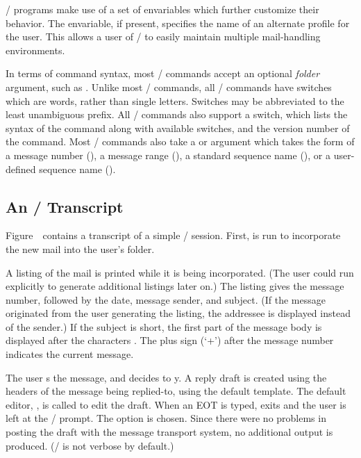 \MH/ programs make use of a set of envariables
which further customize their behavior.
The  envariable, if present,
specifies the name of an alternate profile for the user.
This allows a user of \MH/ to
easily maintain multiple mail-handling environments.

In terms of command syntax,
most \MH/ commands accept an optional {\it folder} argument,
such as .
Unlike most \unix/ commands,
all \MH/ commands have switches which are words, rather than single letters.
Switches may be abbreviated to the least unambiguous prefix.
All \MH/ commands also support a  switch,
which lists the syntax of the command along with available switches,
and the version number of the command.
Most \MH/ commands also take a  or  argument
which takes the form of a message number (), a message range (),
a standard sequence name (),
or a user-defined sequence name ().

\subsection{An \MH/ Transcript}			%
Figure~\session\ contains a transcript of a simple \MH/ session.
First,  is run to incorporate the new mail into the 
user's  folder.

A  listing of the mail is printed while
it is being incorporated.
(The user could run  explicitly to generate additional 
listings later on.)
The  listing gives the message number, followed
by the date, message sender, and subject.
(If the message originated from the user generating the listing,
the  addressee is displayed instead of the sender.)
If the subject is short,
the first part of the message body is displayed after the characters \eg{<<}.
The plus sign (`+') after
the message number indicates the current message.

The user s the message, and decides to y.
A reply draft
is created using the headers of the message being replied-to,
using the default  template.
The default editor, , is called to edit the draft.
When an EOT is typed,  exits and the
user is left at the \whatnow/ prompt.
The option  is chosen.
Since there were no problems in posting the draft with the message transport
system, 
no additional output is produced.
(\MH/ is not verbose by default.)

